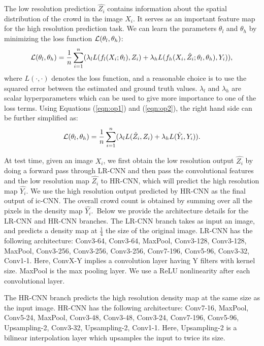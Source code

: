 \documentclass[runningheads]{llncs}
\begin{document}
The low resolution prediction $\hat{Z_i}$ contains information about the spatial distribution of the crowd in the image $X_i$. It serves as an important feature map for the high resolution prediction task. We can learn the parameters $\theta_l$  and $\theta_h$ by minimizing
the loss function $\mathcal{L}(\theta_l, \theta_h)$:
\begin{equation}\label{eqn:loss1}
\mathcal{L}(\theta_l, \theta_h) = \frac{1}{n} \sum_{i=1}^{n}( \lambda_{l}L(f_l(X_i;\theta_l),Z_i) +  \lambda_{h} L(f_h(X_i,\hat{Z}_i;\theta_l, \theta_h),Y_i)), 
\end{equation}
where $L(\cdot, \cdot)$ denotes the loss function, and a reasonable choice is to use the squared error between the estimated and ground truth values. $ \lambda_{l}$ and  $\lambda_{h}$ are scalar hyperparameters which can be used to give more importance to one of the loss terms.
Using Equations (\ref{eqn:op1}) and (\ref{eqn:op2}), the right hand side can be further simplified as:
\begin{equation}\label{eqn:loss2}
\mathcal{L}(\theta_l, \theta_h) = \frac{1}{n} \sum_{i=1}^{n}(\lambda_l L(\hat{Z}_i,Z_i) +  \lambda_h L(\hat{Y}_i,Y_i)).
\end{equation}


At test time, given an image $X_i$, we first obtain the low resolution output $\hat{Z_i}$ by doing a forward pass through LR-CNN and then pass the convolutional features and the low resolution map $\hat{Z_i}$ to HR-CNN, which will predict the high resolution map  $\hat{Y_i}$. We use the high resolution output predicted by HR-CNN as the final output of ic-CNN. The overall crowd count is obtained by summing over all the pixels in the density map $\hat{Y_i}$.\
\newline Below we provide the architecture details for the LR-CNN and HR-CNN branches.
\newline
{} The LR-CNN branch takes as input an image, and predicts a density map at $\frac{1}{4}$ the size of the original image. LR-CNN has the following architecture:
Conv3-64, Conv3-64, MaxPool, Conv3-128, Conv3-128, MaxPool, Conv3-256, Conv3-256, Conv3-256, Conv7-196, Conv5-96, Conv3-32, Conv1-1. Here, ConvX-Y implies a convolution layer having Y filters with  kernel size. MaxPool is the max pooling layer. We use a ReLU nonlinearity after each convolutional layer.

The HR-CNN branch predicts the high resolution density map at the same size as the input image. HR-CNN has the following architecture:
Conv7-16, MaxPool, Conv5-24, MaxPool, Conv3-48, Conv3-48, Conv3-24, Conv7-196, Conv5-96, Upsampling-2, Conv3-32, Upsampling-2, Conv1-1. Here, Upsampling-2 is a bilinear interpolation layer which upsamples the input to twice its size.
\end{document}
